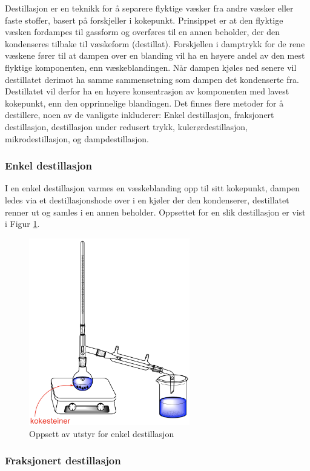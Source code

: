 Destillasjon er en teknikk for å separere flyktige væsker fra andre væsker eller faste stoffer, basert på forskjeller i kokepunkt.\cite{harwood1999experimental} Prinsippet er at den flyktige væsken fordampes til gassform og overføres til en annen beholder, der den kondenseres tilbake til væskeform (destillat). Forskjellen i damptrykk for de rene væskene fører til at dampen over en blanding vil ha en høyere andel av den mest flyktige komponenten, enn væskeblandingen. Når dampen kjøles ned senere vil destillatet derimot ha samme sammensetning som dampen det kondenserte fra. Destillatet vil derfor ha en høyere konsentrasjon av komponenten med lavest kokepunkt, enn den opprinnelige blandingen. 
Det finnes flere metoder for å destillere, noen av de vanligste inkluderer: Enkel destillasjon, fraksjonert destillasjon, destillasjon under redusert trykk, kulerørdestillasjon, mikrodestillasjon, og dampdestillasjon. 

\subsubsection{Enkel destillasjon}

I en enkel destillasjon varmes en væskeblanding opp til sitt kokepunkt, dampen ledes via et destillasjonshode over i en kjøler der den kondenserer, destillatet renner ut og samles i en annen beholder. Oppsettet for en slik destillasjon er vist i Figur \ref{fig:enkel}. 

\begin{figure}[htb!]
    \centering
    \includegraphics[width=7cm]{Figurer/Enkel_destillasjon.png}
    \caption{Oppsett av utstyr for enkel destillasjon}
    \label{fig:enkel}
\end{figure}

\subsubsection{Fraksjonert destillasjon}


